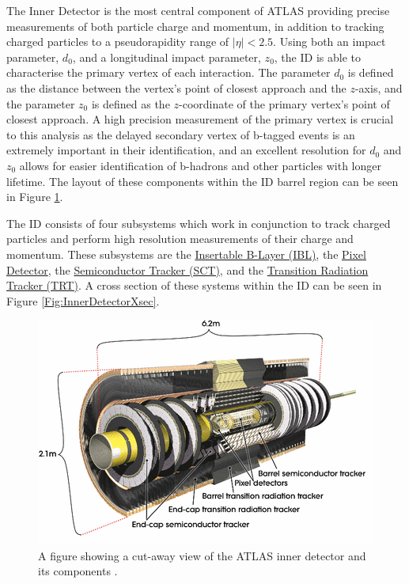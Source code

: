 \documentclass[12pt,a4paper,epsf,portrait,times,epsfig]{article}
\begin{document}
		The Inner Detector \cite{ATLASID1, ATLASID2} is the most central component of ATLAS providing precise measurements of both particle charge and momentum, in addition to tracking charged particles to a pseudorapidity range of $|\eta| < 2.5$. Using both an impact parameter, $d_{0}$, and a longitudinal impact parameter, $z_{0}$, the ID is able to characterise the primary vertex of each interaction. The parameter $d_{0}$ is defined as the distance between the vertex's point of closest approach and the $z$-axis, and the parameter $z_{0}$ is defined as the $z$-coordinate of the primary vertex's point of closest approach. A high precision measurement of the primary vertex is crucial to this analysis as the delayed secondary vertex of b-tagged events is an extremely important in their identification, and an excellent resolution for $d_{0}$ and $z_{0}$ allows for easier identification of b-hadrons and other particles with longer lifetime. The layout of these components within the ID barrel region can be seen in Figure \ref{Fig:InnerDetector}.  

		The ID consists of four subsystems which work in conjunction to track charged particles and perform high resolution measurements of their charge and momentum. These subsystems are the \hyperref[Section:IBL]{Insertable B-Layer (IBL)}, the \hyperref[Section:PixelDetector]{Pixel Detector}, the \hyperref[Section:SCT]{Semiconductor Tracker (SCT)}, and the \hyperref[Section:TRT]{Transition Radiation Tracker (TRT)}. A cross section of these systems within the ID can be seen in Figure \ref{Fig:InnerDetectorXsec}.

		\begin{figure}
			\centering
			\includegraphics[scale=0.7]{Inner_Detector}
			\caption{A figure showing a cut-away view of the ATLAS inner detector and its components \cite{ATLASIDImage}. }
			\label{Fig:InnerDetector}
		\end{figure}
\end{document}

